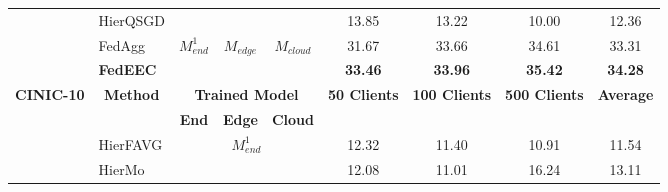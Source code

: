 \documentclass[10pt,journal]{IEEEtran}
\begin{document}
\begin{table}[]
\begin{tabular}{c|l|ccc|ccc|c}
                                   & HierQSGD                                              & \multicolumn{3}{c|}{}                                                     & 13.85                                & 13.22                                 & 10.00                                 & 12.36                             \\ \cline{2-9} 
                                   & FedAgg                                                & \multirow{2}{*}{$M_{end}^1$} & \multirow{2}{*}{$M_{edge}$} & \multirow{2}{*}{$M_{cloud}$} & 31.67                                & 33.66                                 & 34.61                                 & 33.31                             \\
                                   & \textbf{FedEEC}                                       &                        &                        &                         & \textbf{33.46}                       & \textbf{33.96}                        & \textbf{35.42}                        & \textbf{34.28}                    \\ \hline \hline
\multirow{7}{*}{\textbf{CINIC-10}} & \multicolumn{1}{c|}{\multirow{2}{*}{\textbf{Method}}} & \multicolumn{3}{c|}{\textbf{Trained Model}}                               & \multirow{2}{*}{\textbf{50 Clients}} & \multirow{2}{*}{\textbf{100 Clients}} & \multirow{2}{*}{\textbf{500 Clients}} & \multirow{2}{*}{\textbf{Average}} \\
                                   & \multicolumn{1}{c|}{}                                 & \textbf{End}           & \textbf{Edge}          & \textbf{Cloud}          &                                      &                                       &                                       &                                   \\ \cline{2-9} 
                                   & HierFAVG                                              & \multicolumn{3}{c|}{\multirow{3}{*}{$M_{end}^1$}}                               & 12.32                                & 11.40                                 & 10.91                                 & 11.54                             \\
                                   & HierMo                                                & \multicolumn{3}{c|}{}                                                     & 12.08                                & 11.01                                 & 16.24                                 & 13.11                             \\

\end{tabular}
\end{table}
\end{document}
